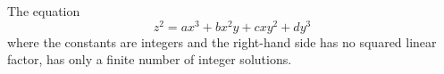 \begin{proposition}
    The equation
\[
    z^2=ax^3+bx^2y+cxy^2+dy^3
\]
    where the constants are integers and the right-hand side has no squared linear factor, has only a finite number of integer solutions.
\end{proposition}

